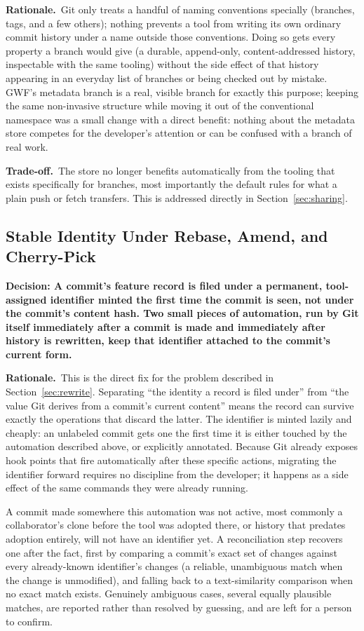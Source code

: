 \documentclass[11pt]{article}
\newcommand{\decision}[1]{\medskip\noindent\textbf{Decision: #1}\par\nopagebreak\smallskip}
\newcommand{\rationale}{\noindent\textbf{Rationale.}\ }
\newcommand{\tradeoff}{\noindent\textbf{Trade-off.}\ }
\begin{document}
\rationale Git only treats a handful of naming conventions specially
(branches, tags, and a few others); nothing prevents a tool from writing
its own ordinary commit history under a name outside those conventions.
Doing so gets every property a branch would give (a durable, append-only,
content-addressed history, inspectable with the same tooling) without the
side effect of that history appearing in an everyday list of branches or
being checked out by mistake. GWF's metadata branch is a real, visible
branch for exactly this purpose; keeping the same non-invasive structure
while moving it out of the conventional namespace was a small change with
a direct benefit: nothing about the metadata store competes for the
developer's attention or can be confused with a branch of real work.

\tradeoff The store no longer benefits automatically from the tooling
that exists specifically for branches, most importantly the default rules
for what a plain push or fetch transfers. This is addressed directly in
Section~\ref{sec:sharing}.

\subsection{Stable Identity Under Rebase, Amend, and Cherry-Pick}
\label{sec:identity}

\decision{A commit's feature record is filed under a permanent,
tool-assigned identifier minted the first time the commit is seen, not
under the commit's content hash. Two small pieces of automation, run by
Git itself immediately after a commit is made and immediately after
history is rewritten, keep that identifier attached to the commit's
current form.}

\rationale This is the direct fix for the problem described in
Section~\ref{sec:rewrite}. Separating ``the identity a record is filed
under'' from ``the value Git derives from a commit's current content''
means the record can survive exactly the operations that discard the
latter. The identifier is minted lazily and cheaply: an unlabeled commit
gets one the first time it is either touched by the automation described
above, or explicitly annotated. Because Git already exposes hook points
that fire automatically after these specific actions, migrating the
identifier forward requires no discipline from the developer; it happens
as a side effect of the same commands they were already running.

A commit made somewhere this automation was not active, most commonly a
collaborator's clone before the tool was adopted there, or history that
predates adoption entirely, will not have an identifier yet. A
reconciliation step recovers one after the fact, first by comparing a
commit's exact set of changes against every already-known identifier's
changes (a reliable, unambiguous match when the change is unmodified),
and falling back to a text-similarity comparison when no exact match
exists. Genuinely ambiguous cases, several equally plausible matches, are
reported rather than resolved by guessing, and are left for a person to
confirm.
\end{document}
